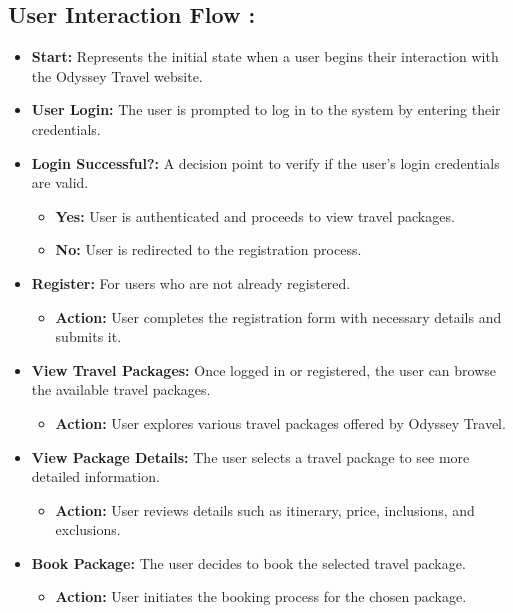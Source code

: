\documentclass{scrreprt}
\begin{document}
\subsection {User Interaction Flow :}
\begin{itemize}
    \item \textbf{Start:} Represents the initial state when a user begins their interaction with the Odyssey Travel website.
    
    \item \textbf{User Login:} The user is prompted to log in to the system by entering their credentials.
    
    \item \textbf{Login Successful?:} A decision point to verify if the user's login credentials are valid.
    \begin{itemize}
        \item \textbf{Yes:} User is authenticated and proceeds to view travel packages.
        \item \textbf{No:} User is redirected to the registration process.
    \end{itemize}
    
    \item \textbf{Register:} For users who are not already registered.
    \begin{itemize}
        \item \textbf{Action:} User completes the registration form with necessary details and submits it.
    \end{itemize}
    
    \item \textbf{View Travel Packages:} Once logged in or registered, the user can browse the available travel packages.
    \begin{itemize}
        \item \textbf{Action:} User explores various travel packages offered by Odyssey Travel.
    \end{itemize}
    
    \item \textbf{View Package Details:} The user selects a travel package to see more detailed information.
    \begin{itemize}
        \item \textbf{Action:} User reviews details such as itinerary, price, inclusions, and exclusions.
    \end{itemize}
    
    \item \textbf{Book Package:} The user decides to book the selected travel package.
    \begin{itemize}
        \item \textbf{Action:} User initiates the booking process for the chosen package.
    \end{itemize}
    

\end{itemize}
\end{document}
